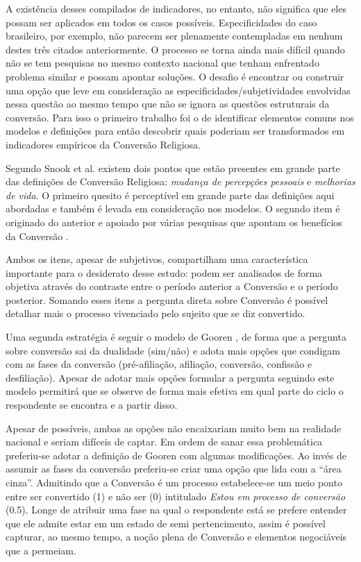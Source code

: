 \documentclass[
	12pt,				%
	oneside,			%
	a4paper,			%
	sumario=tradicional,
	english,			%
	brazil				%
	]{abntex2}
\begin{document}
A existência desses compilados de indicadores, no entanto, não significa que eles possam ser aplicados em todos os casos possíveis. Especificidades do caso brasileiro, por exemplo, não parecem ser plenamente contempladas em nenhum destes três citados anteriormente. O processo se torna ainda mais difícil quando não se tem pesquisas no mesmo contexto nacional que tenham enfrentado problema similar e possam apontar soluções. O desafio é encontrar ou construir uma opção que leve em consideração as especificidades/subjetividades envolvidas nessa questão ao mesmo tempo que não se ignora as questões estruturais da conversão. Para isso o primeiro trabalho foi o de identificar elementos comuns nos modelos e definições para então descobrir quais poderiam ser transformados em indicadores empíricos da Conversão Religiosa.

Segundo Snook et al. \autocite*{snook_issues_2019} existem dois pontos que estão presentes em grande parte das definições de Conversão Religiosa: \emph{mudança de percepções pessoais} e \emph{melhorias de vida}. O primeiro quesito é perceptível em grande parte das definições aqui abordadas e também é levada em consideração nos modelos. O segundo item é originado do anterior e apoiado por várias pesquisas que apontam os benefícios da Conversão \autocite{cerqueira-santos_religiao_2004-1,krause_stress_2011,verona_explanations_2011,mariz_libertacao_1994,potter_growth_2016}.

Ambos os itens, apesar de subjetivos, compartilham uma característica importante para o desiderato desse estudo: podem ser analisados de forma objetiva através do contraste entre o período anterior a Conversão e o período posterior. Somando esses itens a pergunta direta sobre Conversão é possível detalhar mais o processo vivenciado pelo sujeito que se diz convertido.

Uma segunda estratégia é seguir o modelo de Gooren \autocite*{gooren_reassessing_2007-1}, de forma que a pergunta sobre conversão sai da dualidade (sim/não) e adota mais opções que condigam com as fases da conversão (pré-afiliação, afiliação, conversão, confissão e desfiliação). Apesar de adotar mais opções formular a pergunta seguindo este modelo permitirá que se observe de forma mais efetiva em qual parte do ciclo o respondente se encontra e a partir disso.

Apesar de possíveis, ambas as opções não encaixariam muito bem na realidade nacional e seriam difíceis de captar. Em ordem de sanar essa problemática preferiu-se adotar a definição de Gooren com algumas modificações. Ao invés de assumir as fases da conversão preferiu-se criar uma opção que lida com a ``área cinza''. Admitindo que a Conversão é um processo estabelece-se um meio ponto entre ser convertido (1) e não ser (0) intitulado \emph{Estou em processo de conversão} (0.5). Longe de atribuir uma fase na qual o respondente está se prefere entender que ele admite estar em um estado de semi pertencimento, assim é possível capturar, ao mesmo tempo, a noção plena de Conversão e elementos negociáveis que a permeiam.
\end{document}

